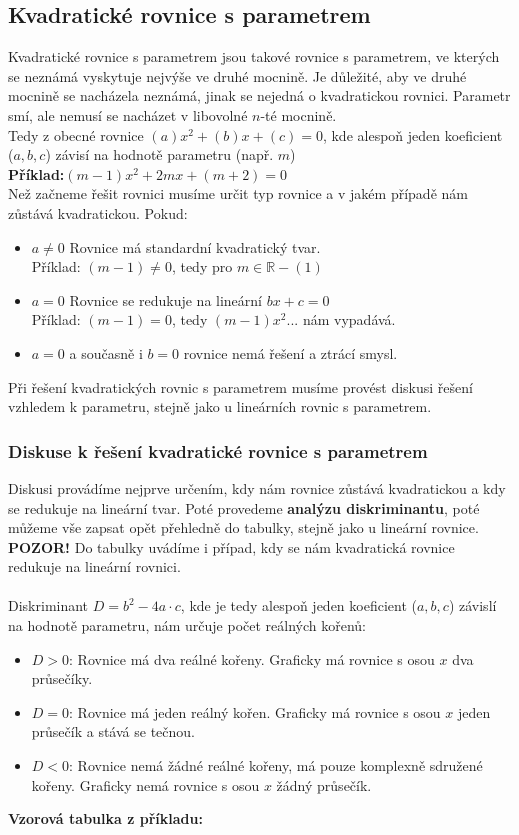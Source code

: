     \subsection{Kvadratické rovnice s parametrem}
Kvadratické rovnice s parametrem jsou takové rovnice s parametrem, ve kterých se neznámá vyskytuje nejvýše ve druhé mocnině. Je důležité, aby ve druhé mocnině se nacházela neznámá, jinak se nejedná o kvadratickou rovnici. Parametr smí, ale nemusí se nacházet v libovolné $n$-té mocnině.\\
Tedy z obecné rovnice $(a)x^2+(b)x+(c)=0$, kde alespoň jeden koeficient ($a,b,c$) závisí na hodnotě parametru (např. $m$)\\
\textbf{Příklad:}$(m-1)x^2+2mx+(m+2)=0$\\
Než začneme řešit rovnici musíme určit typ rovnice a v jakém případě nám zůstává kvadratickou. Pokud:
\begin{itemize}
    \item $a\not=0$ Rovnice má standardní kvadratický tvar.\\
    Příklad: $(m-1)\not=0$, tedy pro $m\in\mathbb{R}-(1)$
    \item $a=0$ Rovnice se redukuje na lineární $bx+c=0$\\
    Příklad: $(m-1)=0$, tedy $(m-1)x^2...$ nám vypadává.
    \item $a=0$ a současně i $b=0$ rovnice nemá řešení a ztrácí smysl.
\end{itemize}

Při řešení kvadratických rovnic s parametrem musíme provést diskusi řešení vzhledem k parametru, stejně jako u lineárních rovnic s parametrem.
        \subsubsection{Diskuse k řešení kvadratické rovnice s parametrem}
Diskusi provádíme nejprve určením, kdy nám rovnice zůstává kvadratickou a kdy se redukuje na lineární tvar. Poté provedeme \textbf{analýzu diskriminantu}, poté můžeme vše zapsat opět přehledně do tabulky, stejně jako u lineární rovnice. \textbf{POZOR!} Do tabulky uvádíme i případ, kdy se nám kvadratická rovnice redukuje na lineární rovnici.\\\\
Diskriminant $D=b^2-4a\cdot c$, kde je tedy alespoň jeden koeficient ($a, b, c$) závislí na hodnotě parametru, nám určuje počet reálných kořenů:\\
\begin{itemize}
    \item $D>0$: Rovnice má dva reálné kořeny. Graficky má rovnice s osou $x$ dva průsečíky.
    \item $D=0$: Rovnice má jeden reálný kořen. Graficky má rovnice s osou $x$ jeden průsečík a stává se tečnou.
    \item $D<0$: Rovnice nemá žádné reálné kořeny, má pouze komplexně sdružené kořeny. Graficky nemá rovnice s osou $x$ žádný průsečík.
\end{itemize}
\textbf{Vzorová tabulka z příkladu:}
        
